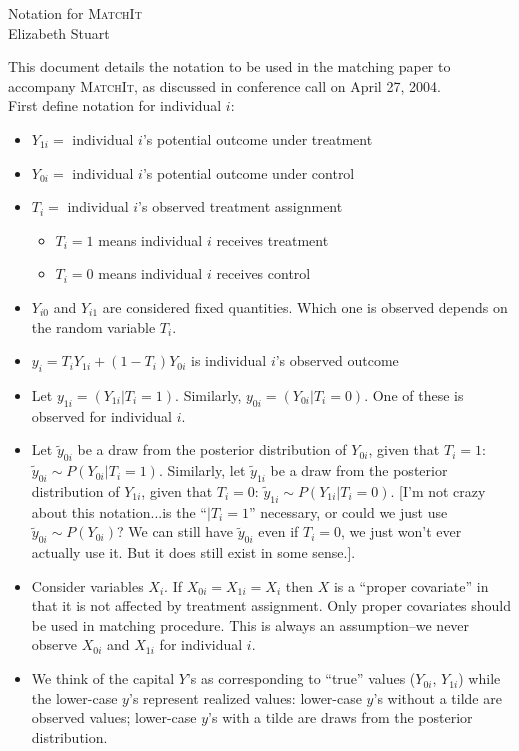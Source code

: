 \documentclass[oneside,letterpaper,titlepage,12pt]{article}
\newcommand{\MatchIt}{\textsc{MatchIt}}
\begin{document}
\begin{center}
Notation for \MatchIt \\
Elizabeth Stuart \\
\end{center}

This document details the notation to be used in the matching paper to accompany \MatchIt,
as discussed in conference call on April 27, 2004. \\


First define notation for individual $i$:
\begin{itemize}
\item $Y_{1i}=$ individual $i$'s potential outcome under treatment 
\item $Y_{0i}=$ individual $i$'s potential outcome under control
\item $T_i=$ individual $i$'s observed treatment assignment 
\begin{itemize} \item $T_i=1$ means individual $i$ receives treatment
		\item $T_i=0$ means individual $i$ receives control
\end{itemize}
\item $Y_{i0}$ and $Y_{i1}$ are considered fixed quantities.  Which one is observed depends on the random variable $T_i$.
\item $y_i=T_i Y_{1i} + (1-T_i) Y_{0i}$ is individual $i$'s observed outcome
\item Let $y_{1i}=(Y_{1i}|T_i=1)$.  Similarly, $y_{0i}=(Y_{0i}|T_i=0)$.  One of these is observed for individual $i$.
\item Let $\tilde{y}_{0i}$ be a draw from the posterior distribution of $Y_{0i}$, given that $T_i=1$: $\tilde{y}_{0i} \sim P(Y_{0i}|T_i=1)$. 
Similarly, let  $\tilde{y}_{1i}$ be a draw from the posterior distribution of $Y_{1i}$, 
given that $T_i=0$: $\tilde{y}_{1i} \sim P(Y_{1i}|T_i=0)$.
[I'm not crazy about this 
notation...is the ``$|T_i=1$'' necessary, or could we just use $\tilde{y}_{0i} \sim P(Y_{0i})$?  
We can still have $\tilde{y}_{0i}$ even if $T_i=0$, we just won't ever actually use it.  But it does still exist in some
sense.].  
\item Consider variables $X_i$.  If $X_{0i}=X_{1i}=X_i$ then $X$ is a ``proper covariate'' in that it is not affected by treatment assignment.  Only proper
covariates should be used in matching procedure.  This is always an assumption--we never observe $X_{0i}$ and $X_{1i}$ for individual $i$.
\item We think of the capital $Y$'s as corresponding to ``true'' values ($Y_{0i}$, $Y_{1i}$) while the lower-case $y$'s represent realized values:
lower-case $y$'s without a tilde are observed values; lower-case $y$'s with a tilde are draws from the posterior distribution.
\end{itemize}
\end{document}
